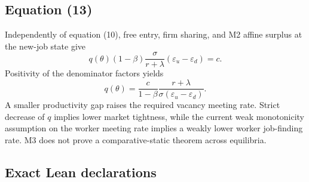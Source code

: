 \documentclass[11pt]{article}
\begin{document}
\subsection{Equation (13)}

Independently of equation (10), free entry, firm sharing, and M2 affine surplus
at the new-job state give
\[
q(\theta)(1-\beta)\frac{\sigma}{r+\lambda}
  (\varepsilon_u-\varepsilon_d)=c.
\]
Positivity of the denominator factors yields
\begin{equation}
q(\theta)
=\frac{c}{1-\beta}
 \frac{r+\lambda}{\sigma(\varepsilon_u-\varepsilon_d)}.
\tag{13}
\end{equation}
A smaller productivity gap raises the required vacancy meeting rate. Strict
decrease of \(q\) implies lower market tightness, while the current weak
monotonicity assumption on the worker meeting rate implies a weakly lower
worker job-finding rate. M3 does not prove a comparative-static theorem across
equilibria.

\subsection{Exact Lean declarations}
\end{document}
